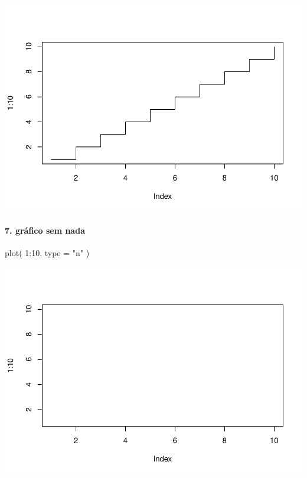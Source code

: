 \documentclass[
]{article}
\newenvironment{Shaded}{\begin{snugshade}}{\end{snugshade}}
\newcommand{\AttributeTok}[1]{\textcolor[rgb]{0.77,0.63,0.00}{#1}}
\newcommand{\DecValTok}[1]{\textcolor[rgb]{0.00,0.00,0.81}{#1}}
\newcommand{\FunctionTok}[1]{\textcolor[rgb]{0.00,0.00,0.00}{#1}}
\newcommand{\NormalTok}[1]{#1}
\newcommand{\SpecialCharTok}[1]{\textcolor[rgb]{0.00,0.00,0.00}{#1}}
\newcommand{\StringTok}[1]{\textcolor[rgb]{0.31,0.60,0.02}{#1}}
\begin{document}
\includegraphics{presencial_função_plot_04_turma_B_files/figure-latex/unnamed-chunk-7-1.pdf}

\hypertarget{gruxe1fico-sem-nada}{%
\paragraph{7. gráfico sem nada}\label{gruxe1fico-sem-nada}}

\begin{Shaded}
\begin{Highlighting}[]
\FunctionTok{plot}\NormalTok{( }\DecValTok{1}\SpecialCharTok{:}\DecValTok{10}\NormalTok{, }\AttributeTok{type =} \StringTok{"n"}\NormalTok{ )}
\end{Highlighting}
\end{Shaded}

\includegraphics{presencial_função_plot_04_turma_B_files/figure-latex/unnamed-chunk-8-1.pdf}
\end{document}
